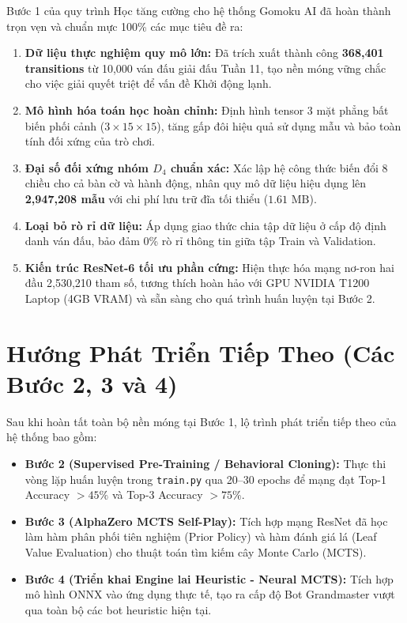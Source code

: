\documentclass[11pt,a4paper]{report}
\begin{document}
Bước 1 của quy trình Học tăng cường cho hệ thống Gomoku AI đã hoàn thành trọn vẹn và chuẩn mực 100\% các mục tiêu đề ra:
\begin{enumerate}
    \item \textbf{Dữ liệu thực nghiệm quy mô lớn:} Đã trích xuất thành công \textbf{368,401 transitions} từ 10,000 ván đấu giải đấu Tuần 11, tạo nền móng vững chắc cho việc giải quyết triệt để vấn đề Khởi động lạnh.
    \item \textbf{Mô hình hóa toán học hoàn chỉnh:} Định hình tensor 3 mặt phẳng bất biến phối cảnh ($3 \times 15 \times 15$), tăng gấp đôi hiệu quả sử dụng mẫu và bảo toàn tính đối xứng của trò chơi.
    \item \textbf{Đại số đối xứng nhóm $D_4$ chuẩn xác:} Xác lập hệ công thức biến đổi 8 chiều cho cả bàn cờ và hành động, nhân quy mô dữ liệu hiệu dụng lên \textbf{2,947,208 mẫu} với chi phí lưu trữ đĩa tối thiểu ($1.61\text{ MB}$).
    \item \textbf{Loại bỏ rò rỉ dữ liệu:} Áp dụng giao thức chia tập dữ liệu ở cấp độ định danh ván đấu, bảo đảm 0\% rò rỉ thông tin giữa tập Train và Validation.
    \item \textbf{Kiến trúc ResNet-6 tối ưu phần cứng:} Hiện thực hóa mạng nơ-ron hai đầu 2,530,210 tham số, tương thích hoàn hảo với GPU NVIDIA T1200 Laptop (4GB VRAM) và sẵn sàng cho quá trình huấn luyện tại Bước 2.
\end{enumerate}

\section{Hướng Phát Triển Tiếp Theo (Các Bước 2, 3 và 4)}

Sau khi hoàn tất toàn bộ nền móng tại Bước 1, lộ trình phát triển tiếp theo của hệ thống bao gồm:
\begin{itemize}
    \item \textbf{Bước 2 (Supervised Pre-Training / Behavioral Cloning):} Thực thi vòng lặp huấn luyện trong \texttt{train.py} qua 20--30 epochs để mạng đạt Top-1 Accuracy $> 45\%$ và Top-3 Accuracy $> 75\%$.
    \item \textbf{Bước 3 (AlphaZero MCTS Self-Play):} Tích hợp mạng ResNet đã học làm hàm phân phối tiên nghiệm (Prior Policy) và hàm đánh giá lá (Leaf Value Evaluation) cho thuật toán tìm kiếm cây Monte Carlo (MCTS).
    \item \textbf{Bước 4 (Triển khai Engine lai Heuristic - Neural MCTS):} Tích hợp mô hình ONNX vào ứng dụng thực tế, tạo ra cấp độ Bot Grandmaster vượt qua toàn bộ các bot heuristic hiện tại.
\end{itemize}
\end{document}
